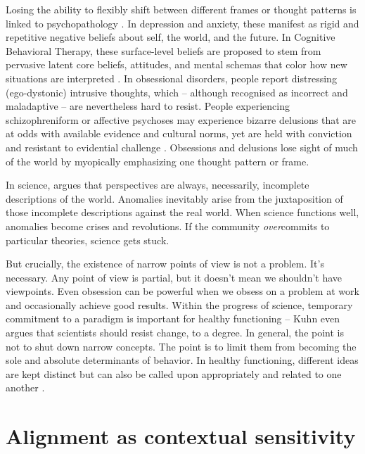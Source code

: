 \documentclass[12pt]{article}
\begin{document}
Losing the ability to flexibly shift between different frames or thought patterns is linked to psychopathology \citep{kashdan2010psychological, reich1933character, shapiro1965neurotic}. In depression and anxiety, these manifest as rigid and repetitive negative beliefs about self, the world, and the future. In Cognitive Behavioral Therapy, these surface-level beliefs are proposed to stem from pervasive latent core beliefs, attitudes, and mental schemas that color how new situations are interpreted \citep{beck2011cognitive}. In obsessional disorders, people report distressing (ego-dystonic) intrusive thoughts, which -- although recognised as incorrect and maladaptive -- are nevertheless hard to resist. People experiencing schizophreniform or affective psychoses may experience bizarre delusions that are at odds with available evidence and cultural norms, yet are held with conviction and resistant to evidential challenge \citep{mishara2010klaus, jaspers1997general, american2013diagnostic, heinz2019towards, adams2013computational}. Obsessions and delusions lose sight of much of the world by myopically emphasizing one thought pattern or frame.

In science, \cite{kuhn1970structure} argues that perspectives are always, necessarily, incomplete descriptions of the world. Anomalies inevitably arise from the juxtaposition of those incomplete descriptions against the real world. When science functions well, anomalies become crises and revolutions. If the community \textit{over}commits to particular theories, science gets stuck.

But crucially, the existence of narrow points of view is not a problem. It's necessary. Any point of view is partial, but it doesn't mean we shouldn't have viewpoints. Even obsession can be powerful when we obsess on a problem at work and occasionally achieve good results. Within the progress of science, temporary commitment to a paradigm is important for healthy functioning -- Kuhn even argues that scientists should resist change, to a degree. In general, the point is not to shut down narrow concepts. The point is to limit them from becoming the sole and absolute determinants of behavior. In healthy functioning, different ideas are kept distinct but can also be called upon appropriately and related to one another \citep{hatano1984two, tetlock1986value, herzog2014harnessing, gigerenzer2011heuristic}. 


\section{Alignment as contextual sensitivity}
\end{document}
